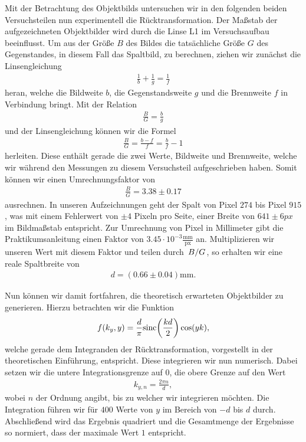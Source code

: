 Mit der Betrachtung des Objektbilds untersuchen wir in den folgenden beiden Versuchsteilen nun experimentell die Rücktransformation. Der Maßstab der aufgezeichneten Objektbilder wird durch die Linse L1 im Versuchsaufbau beeinflusst. Um aus der Größe $B$ des Bildes die tatsächliche Größe $G$ des Gegenstandes, in diesem Fall das Spaltbild, zu berechnen, ziehen wir zunächst die Linsengleichung
\begin{align}
  \frac{1}{b} + \frac{1}{g} = \frac{1}{f}
\end{align}
heran, welche die Bildweite $b$, die Gegenstandsweite $g$ und die Brennweite $f$ in Verbindung bringt. Mit der Relation
\begin{align}
  \frac{B}{G} = \frac{b}{g}
\end{align}
und der Linsengleichung können wir die Formel
\begin{align}
  \frac{B}{G} = \frac{b - f}{f} = \frac{b}{f} - 1
\end{align}
herleiten. Diese enthält gerade die zwei Werte, Bildweite und Brennweite, welche wir während den Messungen zu diesem Versuchsteil aufgeschrieben haben. Somit können wir einen Umrechnungsfaktor von
\begin{align}
  \frac{B}{G} = 3.38 \pm 0.17
\end{align}
ausrechnen. In unseren Aufzeichnungen geht der Spalt von Pixel $274$ bis Pixel $915$, was mit einem Fehlerwert von $\pm 4$ Pixeln pro Seite, einer Breite von $641 \pm 6 px$ im Bildmaßstab entspricht. Zur Umrechnung von Pixel in Millimeter gibt die Praktikumsanleitung einen Faktor von $3.45 \cdot 10^{-3} \frac{\si{\milli\meter}}{\mathrm{px}}$ an. Multiplizieren wir unseren Wert mit diesem Faktor und teilen durch $\ffrac{B}{G}$, so erhalten wir eine reale Spaltbreite von
\begin{align}
  d = (0.66 \pm 0.04)\si{\milli\meter}.
\end{align}

Nun können wir damit fortfahren, die theoretisch erwarteten Objektbilder zu generieren. Hierzu betrachten wir die Funktion
\begin{align}
  f(k_y, y) = \frac{d}{\pi} \mathrm{sinc}\qty(\frac{kd}{2}) \cos(yk),
\end{align}
welche gerade dem Integranden der Rücktransformation, vorgestellt in der theoretischen Einführung, entspricht. Diese integrieren wir nun numerisch. Dabei setzen wir die untere Integrationsgrenze auf $0$, die obere Grenze auf den Wert
\begin{align}
  k_{y,n} = \frac{2\pi n}{d},
\end{align}
wobei $n$ der Ordnung angibt, bis zu welcher wir integrieren möchten. Die Integration führen wir für $400$ Werte von $y$ im Bereich von $-d$ bis $d$ durch. Abschließend wird das Ergebnis quadriert und die Gesamtmenge der Ergebnisse so normiert, dass der maximale Wert $1$ entspricht.

